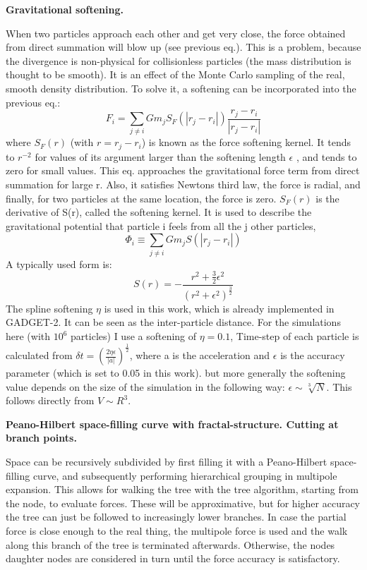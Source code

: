 \centerline{\textbf{Gravitational softening.}} 
When two particles approach each other and get very close, the force obtained from direct summation will blow up (see previous eq.). This is a problem, because the divergence is non-physical for collisionless particles (the mass distribution is thought to be smooth). It is an effect of the Monte Carlo sampling of the real, smooth density distribution. To solve it, a softening can be incorporated into the previous eq.:
\begin{equation}
F_i = \sum\limits_{j \neq i} Gm_j S_F(|r_j - r_i|) \frac{r_j - r_i}{|r_j - r_i|} 
\end{equation}
where $S_F(r)$ (with $ r = r_j - r_i $) is known as the force softening kernel. It tends to $r^{-2}$ for values of its argument larger than the softening length $\epsilon$ , and tends to zero for small values. This eq. approaches the gravitational force term from direct summation for large r. Also, it satisfies Newtons third law, the force is radial, and finally, for two particles at the same location, the force is zero. $S_F(r)$ is the derivative of S(r), called the softening kernel. It is used to describe the gravitational potential that particle i feels from all the j other particles,
\begin{equation}
\Phi_i \equiv \sum\limits_{j \neq i} Gm_j S(|r_j - r_i|)
\end{equation}
A typically used form is:
\begin{equation}
S(r) = -\frac{r^2+\frac{3}{2}\epsilon^2}{(r^2 + \epsilon^2)^{\frac{3}{2}}}
\end{equation}
The spline softening $\eta$ is used in this work, which is already implemented in GADGET-2. It can be seen as the inter-particle distance. For the simulations here (with $10^6$ particles) I use a softening of $ \eta = 0.1 $, Time-step of each particle is calculated from $ \delta t = (\frac{2\eta \epsilon}{|a|})^{\frac{1}{2}}$, where a is the acceleration and $\epsilon$ is the accuracy parameter (which is set to 0.05 in this work). but more generally the softening value depends on the size of the simulation in the following way: $ \epsilon \sim \sqrt[3]{N} $. This follows directly from $  V \sim R^3$. \\ 

\centerline{\textbf{Peano-Hilbert space-filling curve with fractal-structure. Cutting at branch points.}}
Space can be recursively subdivided by first filling it with a Peano-Hilbert space-filling curve, and subsequently performing hierarchical grouping in multipole expansion. This allows for walking the tree with the tree algorithm, starting from the node, to evaluate forces. These will be approximative, but for higher accuracy the tree can just be followed to increasingly lower branches. In case the partial force is close enough to the real thing, the multipole force is used and the walk along this branch of the tree is terminated afterwards. Otherwise, the nodes daughter nodes are considered in turn until the force accuracy is satisfactory. \\ 

